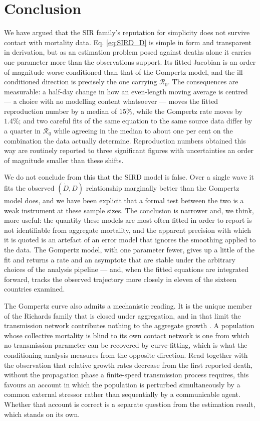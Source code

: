 \documentclass{article}
\begin{document}
\section*{Conclusion}
We have argued that the SIR family's reputation for simplicity does not survive contact
with mortality data. Eq. \ref{eq:SIRD_D} is simple in form and transparent in derivation,
but as an estimation problem posed against deaths alone it carries one parameter more
than the observations support. Its fitted Jacobian is an order of magnitude worse
conditioned than that of the Gompertz model, and the ill-conditioned direction is
precisely the one carrying $\mathcal{R}_0$. The consequences are measurable: a half-day
change in how an even-length moving average is centred --- a choice with no modelling
content whatsoever --- moves the fitted reproduction number by a median of $15\%$, while
the Gompertz rate moves by $1.4\%$; and two careful fits of the same equation to the same
source data differ by a quarter in $\mathcal{R}_0$ while agreeing in the median to about
one per cent on the combination the data actually determine. Reproduction numbers obtained this way are
routinely reported to three significant figures with uncertainties an order of magnitude
smaller than these shifts.

We do not conclude from this that the SIRD model is false. Over a single wave it fits the
observed $(\dot{D},D)$ relationship marginally better than the Gompertz model does, and we
have been explicit that a formal test between the two is a weak instrument at these sample
sizes. The conclusion is narrower and, we think, more useful: the quantity these models are
most often fitted in order to report is not identifiable from aggregate mortality, and the
apparent precision with which it is quoted is an artefact of an error model that ignores
the smoothing applied to the data. The Gompertz model, with one parameter fewer, gives up
a little of the fit and returns a rate and an asymptote that are stable under the arbitrary
choices of the analysis pipeline --- and, when the fitted equations are integrated forward,
tracks the observed trajectory more closely in eleven of the sixteen countries examined.

The Gompertz curve also admits a mechanistic reading. It is the unique member of the
Richards family that is closed under aggregation, and in that limit the transmission
network contributes nothing to the aggregate growth \cite{haugen2026micro}. A population
whose collective mortality is blind to its own contact network is one from which no
transmission parameter can be recovered by curve-fitting, which is what the conditioning
analysis measures from the opposite direction. Read together with the observation that
relative growth rates decrease from the first reported death, without the propagation phase
a finite-speed transmission process requires, this favours an account in which the
population is perturbed simultaneously by a common external stressor rather than
sequentially by a communicable agent. Whether that account is correct is a separate
question from the estimation result, which stands on its own.
\end{document}
